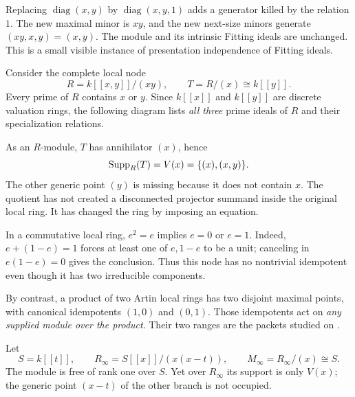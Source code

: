 Replacing $\operatorname{diag}(x,y)$ by $\operatorname{diag}(x,y,1)$ adds a generator killed by the relation $1$. The new maximal minor is $xy$, and the new next-size minors generate $(xy,x,y)=(x,y)$. The module and its intrinsic Fitting ideals are unchanged. This is a small visible instance of presentation independence of Fitting ideals.


Consider the complete local node
\[
R=k[[x,y]]/(xy),\qquad T=R/(x)\cong k[[y]].
\]
Every prime of $R$ contains $x$ or $y$. Since $k[[x]]$ and $k[[y]]$ are discrete valuation rings, the following diagram lists \emph{all three} prime ideals of $R$ and their specialization relations.


As an $R$-module, $T$ has annihilator $(x)$, hence
\[
\operatorname{Supp}_R(T)=V(x)=\{(x),(x,y)\}.
\]
The other generic point $(y)$ is missing because it does not contain $x$. The quotient has not created a disconnected projector summand inside the original local ring. It has changed the ring by imposing an equation.

In a commutative local ring, $e^2=e$ implies $e=0$ or $e=1$. Indeed, $e+(1-e)=1$ forces at least one of $e,1-e$ to be a unit; canceling in $e(1-e)=0$ gives the conclusion. Thus this node has no nontrivial idempotent even though it has two irreducible components.

By contrast, a product of two Artin local rings has two disjoint maximal points, with canonical idempotents $(1,0)$ and $(0,1)$. Those idempotents act on \emph{any supplied module over the product}. Their two ranges are the packets studied on .


Let
\[
S=k[[t]],\qquad R_\infty=S[[x]]/(x(x-t)),\qquad
M_\infty=R_\infty/(x)\cong S.
\]
The module is free of rank one over $S$. Yet over $R_\infty$ its support is only $V(x)$; the generic point $(x-t)$ of the other branch is not occupied.

